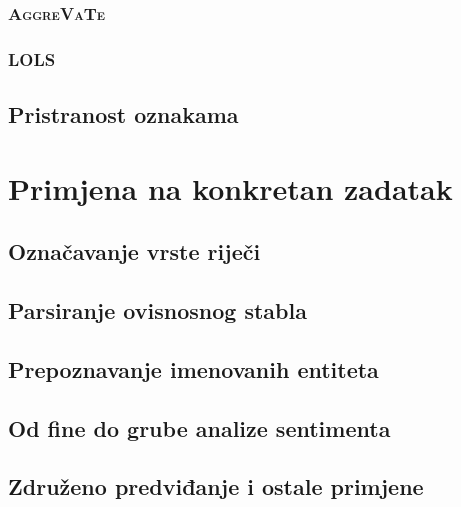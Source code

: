\documentclass[times, utf8, diplomski]{fer}
\begin{document}
\subsection{\textsc{AggreVaTe}}

\subsection{\textsc{LOLS}}\label{ch:LOLS}


\section{Pristranost oznakama}\label{ch:labelbias}


\chapter{Primjena na konkretan zadatak}\label{ch:applications}

\section{Označavanje vrste riječi}\label{ch:postaggingapp}


\section{Parsiranje ovisnosnog stabla}


\section{Prepoznavanje imenovanih entiteta}


\section{Od fine do grube analize sentimenta}


\section{Združeno predviđanje i ostale primjene}

\end{document}
